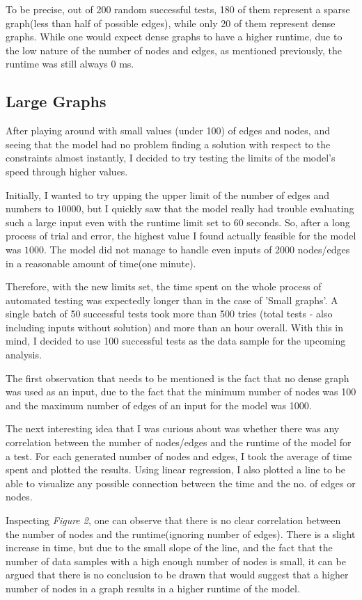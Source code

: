 \documentclass{article}
\begin{document}
To be precise, out of 200 random successful tests, 180 of them represent a sparse graph(less than half of possible edges), while only 20
of them represent dense graphs. While one would expect dense graphs to have a higher runtime, due to the low nature of the number of nodes 
and edges, as mentioned previously, the runtime was still always 0 ms. 
\subsection{Large Graphs} 
After playing around with small values (under 100) of edges and nodes, and seeing that the model had no problem 
finding a solution with respect to the constraints almost instantly, I decided to try testing the limits of the model's speed through higher values.

Initially, I wanted to try upping the upper limit of the number of edges and numbers to $10000$, but I quickly saw that the model really had trouble evaluating such a large input even with the runtime limit set to 60 seconds. 
So, after a long process of trial and error, the highest value I found actually feasible for the model was $1000$. The model did not manage to handle even inputs of 2000 nodes/edges in a reasonable amount 
of time(one minute).  

Therefore, with the new limits set, the time spent on the whole process of automated testing was expectedly longer than in the case of 'Small graphs'. 
A single batch of 50 successful tests took more than 500 tries (total tests - also including inputs without solution) and more than an hour overall. With this in mind, I decided 
to use 100 successful tests as the data sample for the upcoming analysis.

The first observation that needs to be mentioned is the fact that no dense graph was used as an input, due to the fact that the minimum number of nodes was 100 and the maximum number of edges of 
an input for the model was 1000. 

The next interesting idea that I was curious about was whether there was any correlation between the number of nodes/edges and the runtime of the model for 
a test. For each generated number of nodes and edges, I took the average of time spent and plotted the results. Using linear regression, I also plotted a line to be able to visualize any possible 
connection between the time and the no. of edges or nodes.

Inspecting \textit{Figure 2}, one can observe that there is no clear correlation between the number of nodes and the runtime(ignoring number of edges). There is a slight increase in time, but due to the small slope of the line, and 
the fact that the number of data samples with a high enough number of nodes is small, it can be argued that there is no conclusion to be drawn that would suggest that a higher number of nodes in a graph results in a higher runtime of 
the model.
\end{document}
